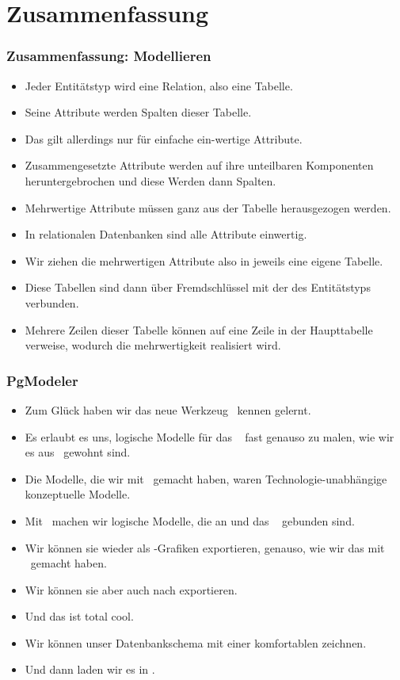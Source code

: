 \documentclass[aspectratio=169,mathserif,notheorems]{beamer}%
\begin{document}
\section{Zusammenfassung}%
%
\begin{frame}%
\frametitle{Zusammenfassung: Modellieren}%
\begin{itemize}%
%
\item<3-> Jeder Entitätstyp wird eine Relation, also eine Tabelle.%
\item<4-> Seine Attribute werden Spalten dieser Tabelle.%
\item<5-> Das gilt allerdings nur für einfache ein-wertige Attribute.%
\item<6-> Zusammengesetzte Attribute werden auf ihre unteilbaren Komponenten heruntergebrochen und diese Werden dann Spalten.%
\item<7-> Mehrwertige Attribute müssen ganz aus der Tabelle herausgezogen werden.%
\item<8-> In relationalen Datenbanken sind alle Attribute einwertig.%
\item<9-> Wir ziehen die mehrwertigen Attribute also in jeweils eine eigene Tabelle.%
\item<10-> Diese Tabellen sind dann über Fremdschlüssel mit der  des Entitätstyps verbunden.%
\item<11-> Mehrere Zeilen dieser Tabelle können auf eine Zeile in der Haupttabelle verweise, wodurch die mehrwertigkeit realisiert wird.%
\end{itemize}%
\end{frame}%
%
\begin{frame}%
\frametitle{PgModeler}%
\begin{itemize}%
\item Zum Glück haben wir das neue Werkzeug \pgmodeler\ kennen gelernt.%
\item<2-> Es erlaubt es uns, logische Modelle für das \postgresql\  fast genauso zu malen, wie wir es aus \yEd\ gewohnt sind.%
\item<3-> Die Modelle, die wir mit \yEd\ gemacht haben, waren Technologie-unabhängige konzeptuelle Modelle.%
\item<4-> Mit \pgmodeler\ machen wir logische Modelle, die an  und das \postgresql\  gebunden sind.%
\item<5-> Wir können sie wieder als -Grafiken exportieren, genauso, wie wir das mit \yEd\ gemacht haben.%
\item<6-> Wir können sie aber auch nach  exportieren.%
\item<7-> Und das ist total cool.%
\item<8-> Wir können unser Datenbankschema mit einer komfortablen  zeichnen.%
\item<9-> Und dann laden wir es in \postgresql.%
\end{itemize}%
\end{frame}%
%
\endPresentation%
\end{document}
